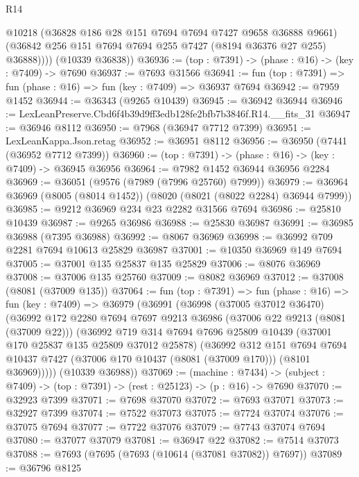 \begin{lexlean}{R14}
\begin{coremodule}
            @10218
            (@36828 @186 @28 @151 @7694 @7694 @7427 @9658 @36888 @9661)
            (@36842 @256 @151 @7694 @7694 @255 @7427 (@8194 @36376 @27 @255) @36888))))
      (@10339 @36838))
@36936 := (top : @7391) -> (phase : @16) -> (key : @7409) -> @7690
@36937 := @7693 @31566
@36941 := fun (top : @7391) => fun (phase : @16) => fun (key : @7409) => @36937 @7694
@36942 := @7959 @1452
@36944 := @36343 (@9265 @10439)
@36945 := @36942 @36944
@36946 := LexLeanPreserve.Cbd6f4b39d9ff3edb128fe2bfb7b3846f.R14.__fits_31
@36947 := @36946 @8112
@36950 := @7968 (@36947 @7712 @7399)
@36951 := LexLeanKappa.Json.retag
@36952 := @36951 @8112
@36956 := @36950 (@7441 (@36952 @7712 @7399))
@36960 := (top : @7391) -> (phase : @16) -> (key : @7409) -> @36945 @36956
@36964 := @7982 @1452 @36944 @36956 @2284
@36969 := @36051 (@9576 (@7989 (@7996 @25760) @7999))
@36979 := @36964 @36969 (@8005 (@8014 @1452)) (@8020 (@8021 (@8022 @2284) @36944 @7999))
@36985 := @9212 @36969 @234 @23 @2282 @31566 @7694
@36986 := @25810 @10439
@36987 := @9265 @36986
@36988 := @25830 @36987
@36991 := @36985 @36988 (@7395 @36988)
@36992 := @8067 @36969
@36998 := @36992 @709 @2281 @7694 @10613 @25829 @36987
@37001 := @10350 @36969 @149 @7694
@37005 := @37001 @135 @25837 @135 @25829
@37006 := @8076 @36969
@37008 := @37006 @135 @25760
@37009 := @8082 @36969
@37012 := @37008 (@8081 (@37009 @135))
@37064 := fun (top : @7391) =>
  fun (phase : @16) =>
  fun (key : @7409) =>
  @36979
    (@36991
      (@36998
        (@37005 @37012 @36470)
        (@36992
          @172
          @2280
          @7694
          @7697
          @9213
          @36986
          (@37006 @22 @9213 (@8081 (@37009 @22)))
          (@36992
            @719
            @314
            @7694
            @7696
            @25809
            @10439
            (@37001 @170 @25837 @135 @25809 @37012 @25878)
            (@36992
              @312
              @151
              @7694
              @7694
              @10437
              @7427
              (@37006 @170 @10437 (@8081 (@37009 @170)))
              (@8101 @36969)))))
      (@10339 @36988))
@37069 := (machine : @7434) ->
  (subject : @7409) -> (top : @7391) -> (rest : @25123) -> (p : @16) -> @7690
@37070 := @32923 @7399
@37071 := @7698 @37070
@37072 := @7693 @37071
@37073 := @32927 @7399
@37074 := @7522 @37073
@37075 := @7724 @37074
@37076 := @37075 @7694
@37077 := @7722 @37076
@37079 := @7743 @37074 @7694
@37080 := @37077 @37079
@37081 := @36947 @22
@37082 := @7514 @37073
@37088 := @7693 (@7695 (@7693 (@10614 (@37081 @37082)) @7697))
@37089 := @36796 @8125

\end{coremodule}
\end{lexlean}
